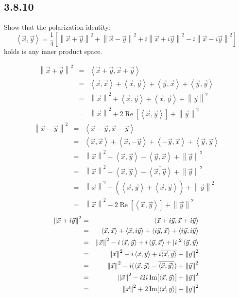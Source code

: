 \documentclass[letterpaper,12pt,fleqn]{article}
\newcommand{\norm}[1]{\left\|#1\right\|}
\newcommand{\inner}[2]{\left<#1,#2\right>}
\newcommand{\conj}[1]{\overline{#1}}
\newcommand{\vx}{\vec{x}}
\newcommand{\vy}{\vec{y}}
\DeclareMathOperator{\Real}{Re}
\DeclareMathOperator{\Imag}{Im}
\begin{document}
\subsection*{3.8.10}

Show that the polarization identity:
\[\inner{\vx}{\vy}=
\frac{1}{4}\left[\norm{\vx+\vy}^2+\norm{\vx-\vy}^2+
  i\norm{\vx+i\vy}^2-i\norm{\vx-i\vy}^2\right]\]
holds is any inner product space.

\begin{eqnarray*}
  \norm{\vx+\vy}^2 &=& \inner{\vx+\vy}{\vx+\vy} \\
  &=& \inner{\vx}{\vx}+\inner{\vx}{\vy}+\inner{\vy}{\vx}+\inner{\vy}{\vy} \\
  &=& \norm{\vx}^2+\inner{\vx}{\vy}+\conj{\inner{\vx}{\vy}}+\norm{\vy}^2 \\
  &=& \norm{\vx}^2+2\Real[\inner{\vx}{\vy}]+\norm{\vy}^2
\end{eqnarray*}
\begin{eqnarray*}
  \norm{\vx-\vy}^2 &=& \inner{\vx-\vy}{\vx-\vy} \\
  &=& \inner{\vx}{\vx}+\inner{\vx}{-\vy}+\inner{-\vy}{\vx}+\inner{\vy}{\vy} \\
  &=& \norm{\vx}^2-\inner{\vx}{\vy}-\inner{\vy}{\vx}+\norm{\vy}^2 \\
  &=& \norm{\vx}^2-\inner{\vx}{\vy}-\conj{\inner{\vx}{\vy}}+\norm{\vy}^2 \\
  &=& \norm{\vx}^2-(\inner{\vx}{\vy}+\conj{\inner{\vx}{\vy}})+\norm{\vy}^2 \\
  &=& \norm{\vx}^2-2\Real[\inner{\vx}{\vy}]+\norm{\vy}^2
\end{eqnarray*}
\begin{eqnarray*}
  \norm{\vx+i\vy}^2 &=& \inner{\vx+i\vy}{\vx+i\vy} \\
  &=& \inner{\vx}{\vx}+\inner{\vx}{i\vy}+\inner{i\vy}{\vx}+\inner{i\vy}{i\vy} \\
  &=& \norm{\vx}^2-i\inner{\vx}{\vy}+i\inner{\vy}{\vx}+
  \abs{i}^2\inner{\vy}{\vy} \\
  &=& \norm{\vx}^2-i\inner{\vx}{\vy}+i\conj{\inner{\vx}{\vy}}+\norm{\vy}^2 \\
  &=& \norm{\vx}^2-i(\inner{\vx}{\vy}-\conj{\inner{\vx}{\vy}})+\norm{\vy}^2 \\
  &=& \norm{\vx}^2-i2i\Imag[\inner{\vx}{\vy}]+\norm{\vy}^2 \\
  &=& \norm{\vx}^2+2\Imag[\inner{\vx}{\vy}]+\norm{\vy}^2
\end{eqnarray*}
\end{document}
